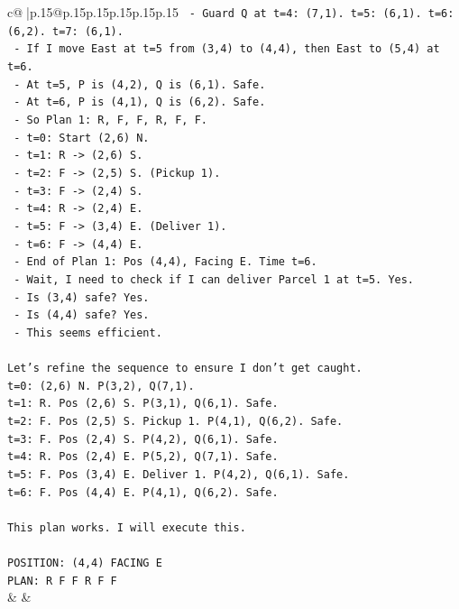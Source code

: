 \documentclass{article}
\begin{document}
{\begin{supertabular}{c@{$\;$}|p{.15\linewidth}@{}p{.15\linewidth}p{.15\linewidth}p{.15\linewidth}p{.15\linewidth}p{.15\linewidth}}
{{{\texttt{       {-} Guard Q at t=4: (7,1). t=5: (6,1). t=6: (6,2). t=7: (6,1).} \\
\texttt{       {-} If I move East at t=5 from (3,4) to (4,4), then East to (5,4) at t=6.} \\
\texttt{       {-} At t=5, P is (4,2), Q is (6,1). Safe.} \\
\texttt{       {-} At t=6, P is (4,1), Q is (6,2). Safe.} \\
\texttt{       {-} So Plan 1: R, F, F, R, F, F.} \\
\texttt{       {-} t=0: Start (2,6) N.} \\
\texttt{       {-} t=1: R {-}> (2,6) S.} \\
\texttt{       {-} t=2: F {-}> (2,5) S. (Pickup 1).} \\
\texttt{       {-} t=3: F {-}> (2,4) S.} \\
\texttt{       {-} t=4: R {-}> (2,4) E.} \\
\texttt{       {-} t=5: F {-}> (3,4) E. (Deliver 1).} \\
\texttt{       {-} t=6: F {-}> (4,4) E.} \\
\texttt{       {-} End of Plan 1: Pos (4,4), Facing E. Time t=6.} \\
\texttt{       {-} Wait, I need to check if I can deliver Parcel 1 at t=5. Yes.} \\
\texttt{       {-} Is (3,4) safe? Yes.} \\
\texttt{       {-} Is (4,4) safe? Yes.} \\
\texttt{       {-} This seems efficient.} \\
\\ 
\texttt{Let's refine the sequence to ensure I don't get caught.} \\
\texttt{t=0: (2,6) N. P(3,2), Q(7,1).} \\
\texttt{t=1: R. Pos (2,6) S. P(3,1), Q(6,1). Safe.} \\
\texttt{t=2: F. Pos (2,5) S. Pickup 1. P(4,1), Q(6,2). Safe.} \\
\texttt{t=3: F. Pos (2,4) S. P(4,2), Q(6,1). Safe.} \\
\texttt{t=4: R. Pos (2,4) E. P(5,2), Q(7,1). Safe.} \\
\texttt{t=5: F. Pos (3,4) E. Deliver 1. P(4,2), Q(6,1). Safe.} \\
\texttt{t=6: F. Pos (4,4) E. P(4,1), Q(6,2). Safe.} \\
\\ 
\texttt{This plan works. I will execute this.} \\
\\ 
\texttt{POSITION: (4,4) FACING E} \\
\texttt{PLAN: R F F R F F} \\
            }
        }
    }
    & & \\ \\


\end{supertabular}}
\end{document}
